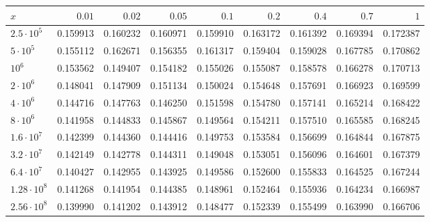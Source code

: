 \begin{tabular}{lrrrrrrrr}
\toprule
$x$ & $0.01$ & $0.02$ & $0.05$ & $0.1$ & $0.2$ & $0.4$ & $0.7$ & $1$ \\
\midrule
$2.5\cdot 10^{5}$ & 0.159913 & 0.160232 & 0.160971 & 0.159910 & 0.163172 & 0.161392 & 0.169394 & 0.172387 \\
$5\cdot 10^{5}$ & 0.155112 & 0.162671 & 0.156355 & 0.161317 & 0.159404 & 0.159028 & 0.167785 & 0.170862 \\
$10^{6}$ & 0.153562 & 0.149407 & 0.154182 & 0.155026 & 0.155087 & 0.158578 & 0.166278 & 0.170713 \\
$2\cdot 10^{6}$ & 0.148041 & 0.147909 & 0.151134 & 0.150024 & 0.154648 & 0.157691 & 0.166923 & 0.169599 \\
$4\cdot 10^{6}$ & 0.144716 & 0.147763 & 0.146250 & 0.151598 & 0.154780 & 0.157141 & 0.165214 & 0.168422 \\
$8\cdot 10^{6}$ & 0.141958 & 0.144833 & 0.145867 & 0.149564 & 0.154211 & 0.157510 & 0.165585 & 0.168245 \\
$1.6\cdot 10^{7}$ & 0.142399 & 0.144360 & 0.144416 & 0.149753 & 0.153584 & 0.156699 & 0.164844 & 0.167875 \\
$3.2\cdot 10^{7}$ & 0.142149 & 0.142778 & 0.144311 & 0.149048 & 0.153051 & 0.156096 & 0.164601 & 0.167379 \\
$6.4\cdot 10^{7}$ & 0.140427 & 0.142955 & 0.143925 & 0.149586 & 0.152600 & 0.155833 & 0.164525 & 0.167244 \\
$1.28\cdot 10^{8}$ & 0.141268 & 0.141954 & 0.144385 & 0.148961 & 0.152464 & 0.155936 & 0.164234 & 0.166987 \\
$2.56\cdot 10^{8}$ & 0.139990 & 0.141202 & 0.143912 & 0.148477 & 0.152339 & 0.155499 & 0.163990 & 0.166706 \\
\bottomrule
\end{tabular}
